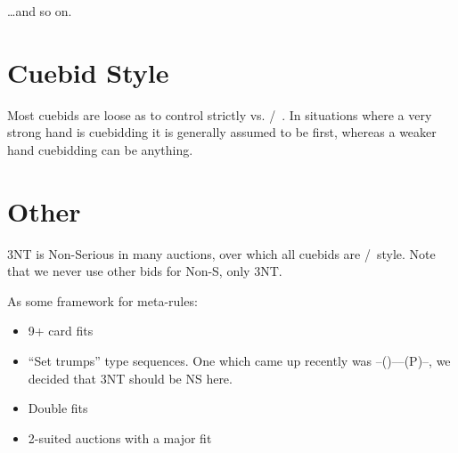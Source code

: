 \documentclass[main]{subfile}
\begin{document}
\ldots and so on.

\section{Cuebid Style}

Most cuebids are loose as to \first control strictly vs. \first/~\second.  In situations where a very strong hand is cuebidding it is generally assumed to be first, whereas a weaker hand cuebidding can be anything.

\section{Other}

3NT is Non-Serious in many auctions, over which all cuebids are \first/~\second style.  Note that we never use other bids for Non-S, only 3NT.

As some framework for meta-rules:

\begin{itemize}
	\item 9+ card fits
	\item ``Set trumps'' type sequences.  One which came up recently was --()----(P)--, we decided that 3NT should be NS here.
	\item Double fits
	\item 2-suited auctions with a major fit
\end{itemize}
\end{document}

